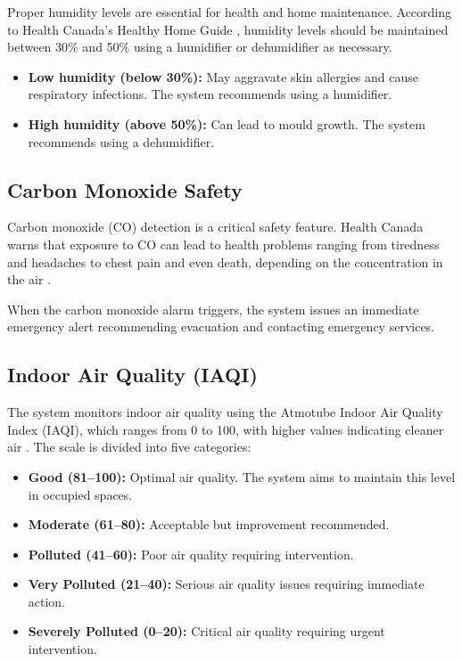 \documentclass{article}
\begin{document}
Proper humidity levels are essential for health and home maintenance. According to Health Canada's Healthy Home Guide \cite{health_canada_home}, humidity levels should be maintained between 30\% and 50\% using a humidifier or dehumidifier as necessary.

\begin{itemize}
    \item \textbf{Low humidity (below 30\%):} May aggravate skin allergies and cause respiratory infections. The system recommends using a humidifier.
    \item \textbf{High humidity (above 50\%):} Can lead to mould growth. The system recommends using a dehumidifier.
\end{itemize}

\subsection{Carbon Monoxide Safety}

Carbon monoxide (CO) detection is a critical safety feature. Health Canada warns that exposure to CO can lead to health problems ranging from tiredness and headaches to chest pain and even death, depending on the concentration in the air \cite{health_canada_home}.

When the carbon monoxide alarm triggers, the system issues an immediate emergency alert recommending evacuation and contacting emergency services.

\subsection{Indoor Air Quality (IAQI)}

The system monitors indoor air quality using the Atmotube Indoor Air Quality Index (IAQI), which ranges from 0 to 100, with higher values indicating cleaner air \cite{atmotube_iaqi}. The scale is divided into five categories:

\begin{itemize}
    \item \textbf{Good (81--100):} Optimal air quality. The system aims to maintain this level in occupied spaces.
    \item \textbf{Moderate (61--80):} Acceptable but improvement recommended.
    \item \textbf{Polluted (41--60):} Poor air quality requiring intervention.
    \item \textbf{Very Polluted (21--40):} Serious air quality issues requiring immediate action.
    \item \textbf{Severely Polluted (0--20):} Critical air quality requiring urgent intervention.
\end{itemize}
\end{document}
